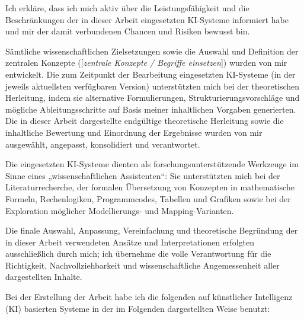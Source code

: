 \documentclass[11pt,a4paper,oneside]{book}
\begin{document}
Ich erkläre, dass ich mich aktiv über die Leistungsfähigkeit und die Beschränkungen der in dieser Arbeit eingesetzten KI-Systeme informiert habe und mir der damit verbundenen Chancen und Risiken bewusst bin.

Sämtliche wissenschaftlichen Zielsetzungen sowie die Auswahl und Definition der zentralen Konzepte ([\textit{zentrale Konzepte / Begriffe einsetzen}]) %
wurden von mir entwickelt. Die zum Zeitpunkt der Bearbeitung eingesetzten KI-Systeme (in der jeweils aktuellsten verfügbaren Version) unterstützten mich bei der theoretischen Herleitung, indem sie alternative Formulierungen, Strukturierungsvorschläge und mögliche Ableitungsschritte auf Basis meiner inhaltlichen Vorgaben generierten. Die in dieser Arbeit dargestellte endgültige theoretische Herleitung sowie die inhaltliche Bewertung und Einordnung der Ergebnisse wurden von mir ausgewählt, angepasst, konsolidiert und verantwortet.

Die eingesetzten KI-Systeme dienten als forschungsunterstützende Werkzeuge im Sinne eines „wissenschaftlichen Assistenten“: Sie unterstützten mich bei der Literaturrecherche, der formalen Übersetzung von Konzepten in mathematische Formeln, Rechenlogiken, Programmcodes, Tabellen und Grafiken sowie bei der Exploration möglicher Modellierungs- und Mapping-Varianten.

Die finale Auswahl, Anpassung, Vereinfachung und theoretische Begründung der in dieser Arbeit verwendeten Ansätze und Interpretationen erfolgten ausschließlich durch mich; ich übernehme die volle Verantwortung für die Richtigkeit, Nachvollziehbarkeit und wissenschaftliche Angemessenheit aller dargestellten Inhalte.

\vspace{0.5cm}

\noindent
Bei der Erstellung der Arbeit habe ich die folgenden auf künstlicher Intelligenz (KI) basierten Systeme in der im Folgenden dargestellten Weise benutzt:

\vspace{0.5cm}
\end{document}
